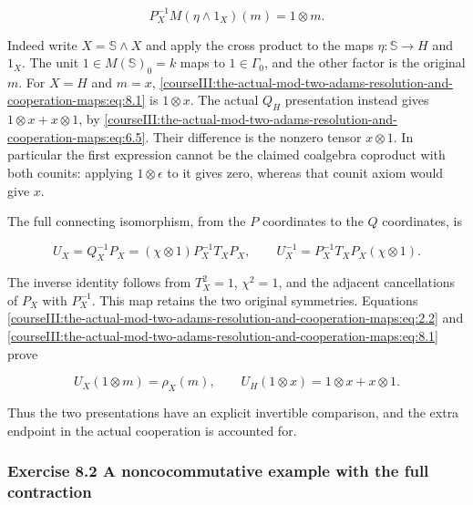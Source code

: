 \begin{equation}
P_X^{-1}M(\eta\wedge1_X)(m)=1\otimes m.
 \label{courseIII:the-actual-mod-two-adams-resolution-and-cooperation-maps:eq:8.1}
\end{equation}

Indeed write \(X=\mathbb S\wedge X\) and apply the cross product to the maps \(\eta:\mathbb S\to H\) and \(1_X\). The unit \(1\in M(\mathbb S)_0=k\) maps to \(1\in\Gamma_0\), and the other factor is the original \(m\). For \(X=H\) and \(m=x\), \eqref{courseIII:the-actual-mod-two-adams-resolution-and-cooperation-maps:eq:8.1} is \(1\otimes x\). The actual \(Q_H\) presentation instead gives \(1\otimes x+x\otimes1\), by \eqref{courseIII:the-actual-mod-two-adams-resolution-and-cooperation-maps:eq:6.5}. Their difference is the nonzero tensor \(x\otimes1\). In particular the first expression cannot be the claimed coalgebra coproduct with both counits: applying \(1\otimes\epsilon\) to it gives zero, whereas that counit axiom would give \(x\).

The full connecting isomorphism, from the \(P\) coordinates to the \(Q\) coordinates, is

\begin{equation}
U_X=Q_X^{-1}P_X
     =(\chi\otimes1)P_X^{-1}T_XP_X,
 \qquad
 U_X^{-1}=P_X^{-1}T_XP_X(\chi\otimes1).
 \label{courseIII:the-actual-mod-two-adams-resolution-and-cooperation-maps:eq:8.2}
\end{equation}

The inverse identity follows from \(T_X^2=1\), \(\chi^2=1\), and the adjacent cancellations of \(P_X\) with \(P_X^{-1}\). This map retains the two original symmetries. Equations \eqref{courseIII:the-actual-mod-two-adams-resolution-and-cooperation-maps:eq:2.2} and \eqref{courseIII:the-actual-mod-two-adams-resolution-and-cooperation-maps:eq:8.1} prove

\begin{equation}
U_X(1\otimes m)=\rho_X(m),\qquad
 U_H(1\otimes x)=1\otimes x+x\otimes1.
 \label{courseIII:the-actual-mod-two-adams-resolution-and-cooperation-maps:eq:8.3}
\end{equation}

Thus the two presentations have an explicit invertible comparison, and the extra endpoint in the actual cooperation is accounted for.

\subsubsection{Exercise 8.2 A noncocommutative example with the full contraction}
\label{courseIII:the-actual-mod-two-adams-resolution-and-cooperation-maps:exercise-8.2}

